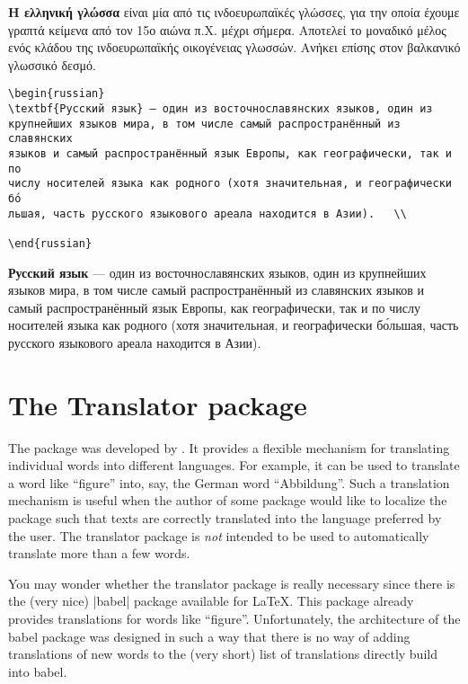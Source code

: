 \topline

\textbf{Η ελληνική γλώσσα} είναι μία από τις ινδοευρωπαϊκές γλώσσες, για την
οποία έχουμε γραπτά κείμενα από τον 15ο αιώνα π.Χ. μέχρι σήμερα. Αποτελεί το
μοναδικό μέλος ενός κλάδου της ινδοευρωπαϊκής οικογένειας γλωσσών. Ανήκει
επίσης στον βαλκανικό γλωσσικό δεσμό.\\	

\bottomline

\begin{verbatim}
\begin{russian}
\textbf{Русский язык} — один из восточнославянских языков, один из 
крупнейших языков мира, в том числе самый распространённый из славянских
языков и самый распространённый язык Европы, как географически, так и по
числу носителей языка как родного (хотя значительная, и географически бо́
льшая, часть русского языкового ареала находится в Азии).	\\

\end{russian}
\end{verbatim}



\textbf{Русский язык} — один из восточнославянских языков, один из крупнейших языков мира, в том числе самый распространённый из славянских языков и самый распространённый язык Европы, как географически, так и по числу носителей языка как родного (хотя значительная, и географически бо́льшая, часть русского языкового ареала находится в Азии).	\\





\section{The Translator package}

The  package was developed by  \citep{translator}. It provides a flexible
mechanism for translating individual words into different languages.
For example, it can be used to translate a word like ``figure'' into,
say, the German word ``Abbildung''. Such a translation mechanism is
useful when the author of some package would like to localize the
package such that texts are correctly translated into the language
preferred by the user. The translator package is \emph{not} intended
to be used to automatically translate more than a few words. 

You may wonder whether the translator package is really necessary
since there is the (very nice) |babel| package available for
\LaTeX. This package already provides translations for words like
``figure''. Unfortunately, the architecture of the babel package was
designed in such a way that there is no way of adding translations of
new words to the (very short) list of translations directly build into
babel.

